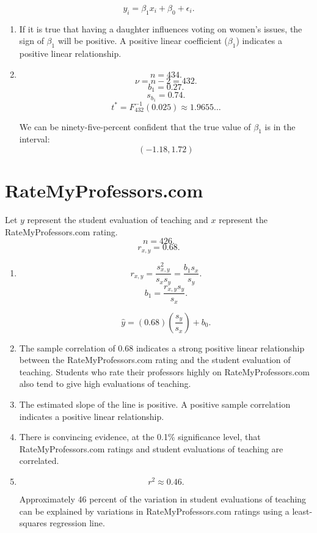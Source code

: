 \documentclass[12pt]{article}
\begin{document}
\[y_i=\beta_1x_i+\beta_0+\epsilon_i.\]

\begin{enumerate}
\item If it is true that having a daughter influences voting on women's issues, the sign of $\beta_1$ will be positive. A positive linear coefficient ($\beta_1$) indicates a positive linear relationship.
\item
\[n=434.\]
\[\nu=n-2=432.\]
\[b_1=0.27.\]
\[s_{b_1}=0.74.\]
\[t^*=F^{-1}_{432}(0.025)\approx 1.9655\dots\]

We can be ninety-five-percent confident that the true value of $\beta_1$ is in the interval:
\[(-1.18,1.72)\]

\end{enumerate}
\section{RateMyProfessors.com}
Let $y$ represent the student evaluation of teaching and $x$ represent the RateMyProfessors.com rating.
\[n=426.\]
\[r_{x,y}=0.68.\]
\begin{enumerate}
\item
\[r_{x,y}=\frac{s^2_{x,y}}{s_xs_y}=\frac{b_1s_x}{s_y}.\]
\[b_1=\frac{r_{x,y}s_y}{s_x}.\]

\[\hat{y}=(0.68)\left(\frac{s_y}{s_x}\right)+b_0.\]
\item The sample correlation of 0.68 indicates a strong positive linear relationship between the RateMyProfessors.com rating and the student evaluation of teaching. Students who rate their professors highly on RateMyProfessors.com also tend to give high evaluations of teaching.
\item The estimated slope of the line is positive. A positive sample correlation indicates a positive linear relationship.
\item There is convincing evidence, at the 0.1\% significance level, that RateMyProfessors.com ratings and student evaluations of teaching are correlated.
\item\[r^2\approx 0.46.\]

Approximately 46 percent of the variation in student evaluations of teaching can be explained by variations in RateMyProfessors.com ratings using a least-squares regression line.
\end{enumerate}
\end{document}
